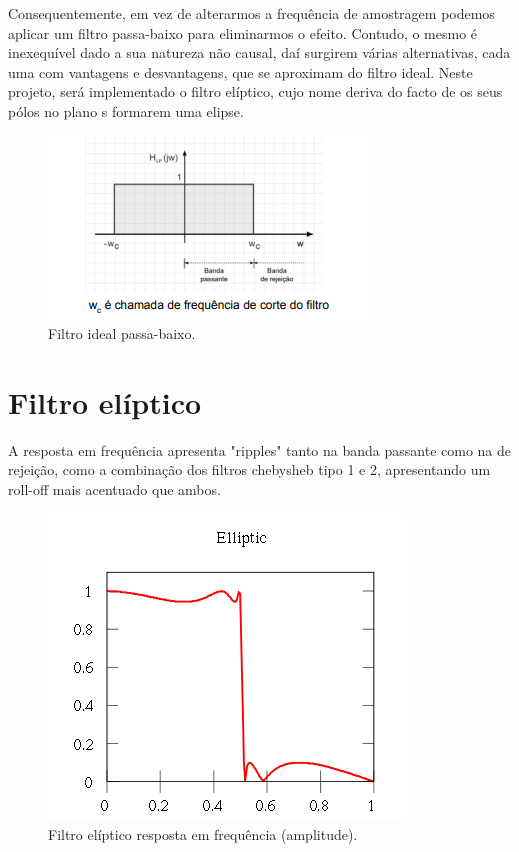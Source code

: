 \documentclass{article}
\begin{document}
    
    Consequentemente, em vez de alterarmos a frequência de amostragem podemos aplicar um filtro passa-baixo para eliminarmos o efeito. Contudo, o mesmo é inexequível dado a sua natureza não causal, daí surgirem várias alternativas, cada uma com vantagens e desvantagens, que se aproximam do filtro ideal. Neste projeto, será implementado o filtro elíptico, cujo nome deriva do facto de os seus pólos no plano s formarem uma elipse.\\
    
\begin{figure}[h!]
\centering
\includegraphics[scale=0.5]{matlab_test_images/outras_imgs/ideal_fil.PNG}
\caption{Filtro ideal passa-baixo.}
\label{fig:matlab_test_images/outras_imgs/ideal_fil}
\end{figure}    
    
\newpage
\section{Filtro elíptico}
  
    
    A resposta em frequência apresenta "ripples" tanto na banda passante como na de rejeição, como a combinação dos filtros chebysheb tipo 1 e 2, apresentando um roll-off mais acentuado que ambos.   

\begin{figure}[h!]
\centering
\includegraphics[scale=0.6]{matlab_test_images/outras_imgs/Ellip.png}
\caption{Filtro elíptico resposta em frequência (amplitude).}
\label{fig:matlab_test_images/outras_imgs/Ellip}
\end{figure}    
    
\end{document}

